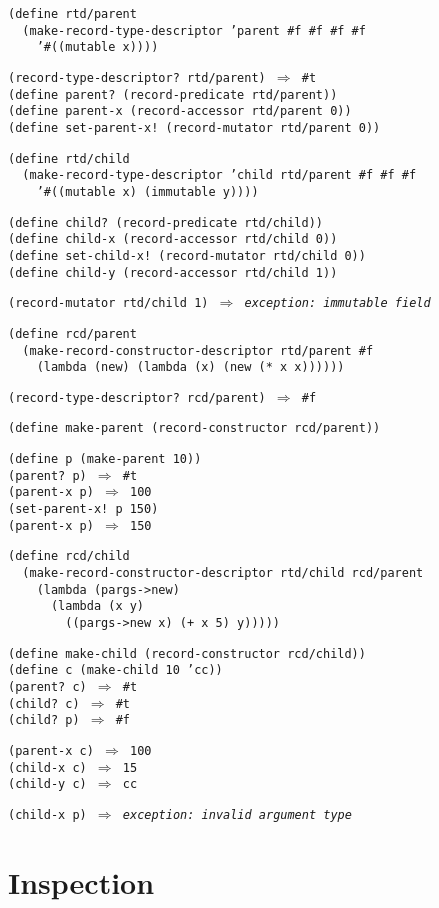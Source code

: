 \begin{alltt}
(define rtd/parent
  (make-record-type-descriptor 'parent \#{}f \#{}f \#{}f \#{}f
    '\#{}((mutable x))))

(record-type-descriptor? rtd/parent) \(\Rightarrow\) \#{}t
(define parent? (record-predicate rtd/parent))
(define parent-x (record-accessor rtd/parent 0))
(define set-parent-x! (record-mutator rtd/parent 0))

(define rtd/child
  (make-record-type-descriptor 'child rtd/parent \#{}f \#{}f \#{}f
    '\#{}((mutable x) (immutable y))))

(define child? (record-predicate rtd/child))
(define child-x (record-accessor rtd/child 0))
(define set-child-x! (record-mutator rtd/child 0))
(define child-y (record-accessor rtd/child 1))

(record-mutator rtd/child 1) \(\Rightarrow\) \textit{exception: immutable field}

(define rcd/parent
  (make-record-constructor-descriptor rtd/parent \#{}f
    (lambda (new) (lambda (x) (new (* x x))))))

(record-type-descriptor? rcd/parent) \(\Rightarrow\) \#{}f

(define make-parent (record-constructor rcd/parent))

(define p (make-parent 10))
(parent? p) \(\Rightarrow\) \#{}t
(parent-x p) \(\Rightarrow\) 100
(set-parent-x! p 150)
(parent-x p) \(\Rightarrow\) 150

(define rcd/child
  (make-record-constructor-descriptor rtd/child rcd/parent
    (lambda (pargs-\textgreater{}new)
      (lambda (x y)
        ((pargs-\textgreater{}new x) (+ x 5) y)))))

(define make-child (record-constructor rcd/child))
(define c (make-child 10 'cc))
(parent? c) \(\Rightarrow\) \#{}t
(child? c) \(\Rightarrow\) \#{}t
(child? p) \(\Rightarrow\) \#{}f

(parent-x c) \(\Rightarrow\) 100
(child-x c) \(\Rightarrow\) 15
(child-y c) \(\Rightarrow\) cc

(child-x p) \(\Rightarrow\) \textit{exception: invalid argument type}
\end{alltt}

\section{\label{records_g141}\label{records_h3}Inspection\label{records_SECTRECORDINSPECTION}}




